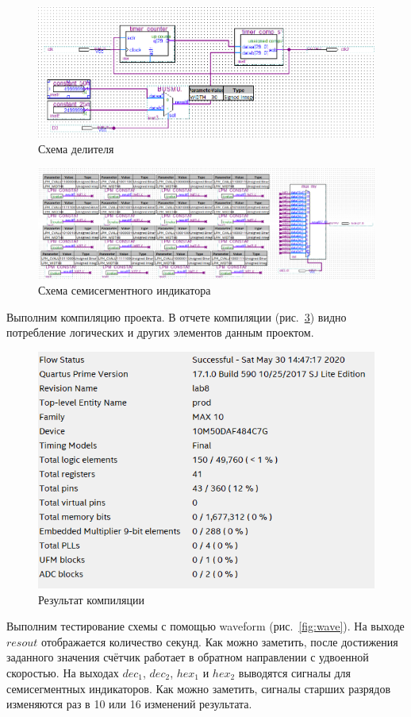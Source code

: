 \documentclass[a4paper,14pt]{article}
\begin{document}
\begin{figure}[H]
	\centering
	\includegraphics[width=\linewidth]{image/schema_div}
	\caption{Схема делителя}
	\label{fig:schema_div}
\end{figure}

\begin{figure}[H]
	\centering
	\includegraphics[width=\linewidth]{image/schema_segment}
	\caption{Схема семисегментного индикатора}
	\label{fig:schema_segment}
\end{figure}

Выполним компиляцию проекта.
В отчете компиляции (рис.~\ref{fig:report}) видно потребление логических и других элементов данным проектом.

\begin{figure}[H]
	\centering
	\includegraphics[width=0.6\linewidth]{image/report}
	\caption{Результат компиляции}
	\label{fig:report}
\end{figure}

Выполним тестирование схемы с помощью waveform (рис.~\ref{fig:wave}).
На выходе $resout$ отображается количество секунд.
Как можно заметить, после достижения заданного значения счётчик работает в обратном направлении с удвоенной скоростью.
На выходах $dec_1$, $dec_2$, $hex_1$ и $hex_2$ выводятся сигналы для семисегментных индикаторов.
Как можно заметить, сигналы старших разрядов изменяются раз в 10 или 16 изменений результата.
\end{document}

